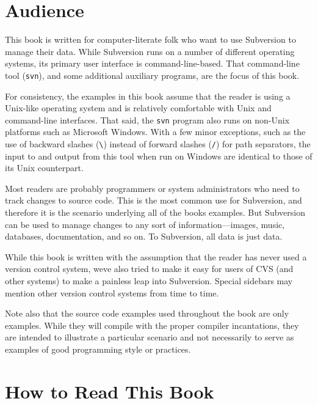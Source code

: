 \section{Audience}\label{svn.preface.audience}

This book is written for computer-literate folk who want to use
Subversion to manage their data. While Subversion runs on a number of
different operating systems, its primary user interface is
command-line-based. That command-line tool (\texttt{svn}), and some
additional auxiliary programs, are the focus of this book.

For consistency, the examples in this book assume that the reader is
using a Unix-like operating system and is relatively comfortable with
Unix and command-line interfaces. That said, the \texttt{svn} program
also runs on non-Unix platforms such as Microsoft Windows. With a few
minor exceptions, such as the use of backward slashes
(\texttt{\textbackslash{}}) instead of forward slashes (\texttt{/}) for
path separators, the input to and output from this tool when run on
Windows are identical to those of its Unix counterpart.

Most readers are probably programmers or system administrators who need
to track changes to source code. This is the most common use for
Subversion, and therefore it is the scenario underlying all of the
book\textquotesingle s examples. But Subversion can be used to manage
changes to any sort of information---images, music, databases,
documentation, and so on. To Subversion, all data is just data.

While this book is written with the assumption that the reader has never
used a version control system, we\textquotesingle ve also tried to make
it easy for users of CVS (and other systems) to make a painless leap
into Subversion. Special sidebars may mention other version control
systems from time to time.

Note also that the source code examples used throughout the book are
only examples. While they will compile with the proper compiler
incantations, they are intended to illustrate a particular scenario and
not necessarily to serve as examples of good programming style or
practices.

\section{How to Read This Book}\label{svn.preface.howread}


